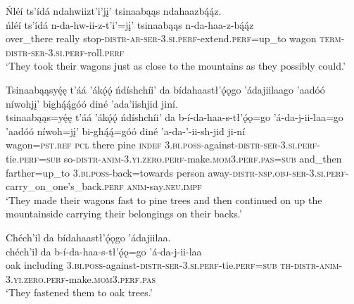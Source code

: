 \ea\label{ex:text6-13-26}
Ńléí ts’ídá ndahwiizt’i’jį’ tsinaabąąs ndahaazbą́ą́z.\\
\gll ńléí	ts’ídá	n-da-hw-ii-z-t’i’=jį’	tsinaabąąs	n-da-haa-z-bą́ą́z\\
     over\_there	really	stop-\textsc{distr}-\textsc{ar}-\textsc{ser}-3.\textsc{si}.\textsc{perf}-extend.\textsc{perf}=up\_to	wagon	\textsc{term}-\textsc{distr}-\textsc{ser}-3.\textsc{si}.\textsc{perf}-roll.\textsc{perf}\\
\glt `They took their wagons just as close to the mountains as they possibly could.'
\z

\ea\label{ex:text6-13-27}
Tsinaabąąsyę́ę t’áá ’ákǫ́ǫ́ ńdíshchíi’ da bídahaastł’ǫ́ǫgo ’ádajiilaago ’aadóó níwohjį’ bighą́ą́góó diné ’ada’iishjid jiní.\\
\gll tsinaabąąs=yę́ę	t’áá	’ákǫ́ǫ́	ńdíshchíi’	da	b-í-da-haa-s-tł’ǫ́ǫ=go	’á-da-j-ii-laa=go	’aadóó	níwoh=jį’	bi-ghą́ą́=góó	diné	’a-da-’-ii-sh-jid	ji-ní\\
     wagon=\textsc{pst}.\textsc{ref}	\textsc{pcl}	there	pine	\textsc{indef}	3.\textsc{bi}.\textsc{poss}-against-\textsc{distr}-\textsc{ser}-3.\textsc{si}.\textsc{perf}-tie.\textsc{perf}=\textsc{sub}	so-\textsc{distr}-\textsc{anim}-3.\textsc{yi}.\textsc{zero}.\textsc{perf}-make.\textsc{mom}3.\textsc{perf}.\textsc{pas}=\textsc{sub}	and\_then	farther=up\_to	3.\textsc{bi}.\textsc{poss}-back=towards	person	away-\textsc{distr}-\textsc{nsp}.\textsc{obj}-\textsc{ser}-3.\textsc{si}.\textsc{perf}-carry\_on\_one's\_back.\textsc{perf}	\textsc{anim}-say.\textsc{neu}.\textsc{impf}\\
\glt `They made their wagons fast to pine trees and then continued on up the mountainside carrying their belongings on their backs.'
\z

\ea\label{ex:text6-13-28}
Chéch’il da bídahaastł’ǫ́ǫgo ’ádajiilaa.\\
\gll chéch’il	da	b-í-da-haa-s-tł’ǫ́ǫ=go	’á-da-j-ii-laa\\
     oak	including	3.\textsc{bi}.\textsc{poss}-against-\textsc{distr}-\textsc{ser}-3.\textsc{si}.\textsc{perf}-tie.\textsc{perf}=\textsc{sub}	\textsc{th}-\textsc{distr}-\textsc{anim}-3.\textsc{yi}.\textsc{zero}.\textsc{perf}-make.\textsc{mom}3.\textsc{perf}.\textsc{pas}\\
\glt `They fastened them to oak trees.'
\z

